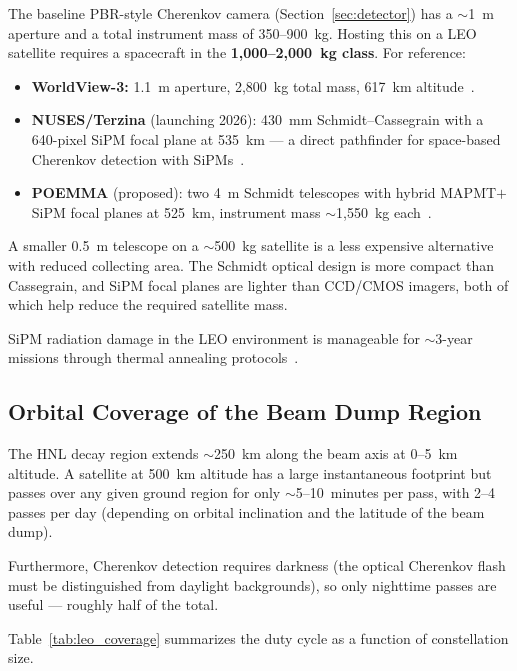 \documentclass[11pt]{article}
\begin{document}
The baseline PBR-style Cherenkov camera
(Section~\ref{sec:detector}) has a $\sim$1~m aperture and a total
instrument mass of 350--900~kg.  Hosting this on a LEO satellite
requires a spacecraft in the \textbf{1,000--2,000~kg class}.
For reference:
\begin{itemize}[nosep]
  \item \textbf{WorldView-3:} 1.1~m aperture, 2,800~kg total mass,
        617~km altitude~\cite{WorldView3}.
  \item \textbf{NUSES/Terzina} (launching 2026): 430~mm
        Schmidt--Cassegrain with a 640-pixel SiPM focal plane at
        535~km --- a direct pathfinder for space-based Cherenkov
        detection with SiPMs~\cite{NUSES-Terzina}.
  \item \textbf{POEMMA} (proposed): two 4~m Schmidt telescopes with
        hybrid MAPMT$+$SiPM focal planes at 525~km, instrument mass
        $\sim$1,550~kg each~\cite{POEMMA}.
\end{itemize}
A smaller 0.5~m telescope on a $\sim$500~kg satellite is a less
expensive alternative with reduced collecting area.  The Schmidt
optical design is more compact than Cassegrain, and SiPM focal planes
are lighter than CCD/CMOS imagers, both of which help reduce the
required satellite mass.

SiPM radiation damage in the LEO environment is manageable for
$\sim$3-year missions through thermal annealing
protocols~\cite{NUSES-Terzina}.

\subsection{Orbital Coverage of the Beam Dump Region}

The HNL decay region extends $\sim$250~km along the beam axis at
0--5~km altitude.  A satellite at 500~km altitude has a large
instantaneous footprint but passes over any given ground region for
only $\sim$5--10~minutes per pass, with 2--4 passes per day (depending
on orbital inclination and the latitude of the beam dump).

Furthermore, Cherenkov detection requires darkness (the optical
Cherenkov flash must be distinguished from daylight backgrounds),
so only nighttime passes are useful --- roughly half of the total.

Table~\ref{tab:leo_coverage} summarizes the duty cycle as a function
of constellation size.
\end{document}
